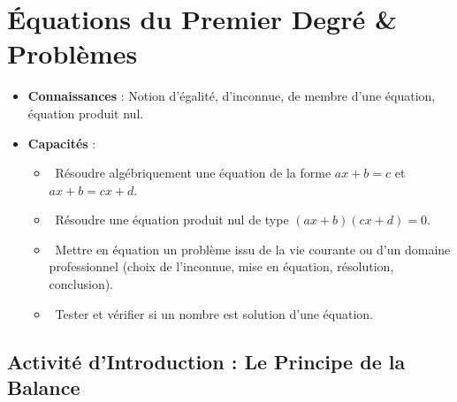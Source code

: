 \chapter{Équations du Premier Degré \& Problèmes}
\label{chap:equations}

\begin{cadreretenu}
\begin{itemize}
    \item \textbf{Connaissances} : Notion d'égalité, d'inconnue, de membre d'une équation, équation produit nul.
    \item \textbf{Capacités} :
    \begin{itemize}
        \item \capRealiser\ Résoudre algébriquement une équation de la forme $ax + b = c$ et $ax + b = cx + d$.
        \item \capRealiser\ Résoudre une équation produit nul de type $(ax + b)(cx + d) = 0$.
        \item \capAnalyser\ Mettre en équation un problème issu de la vie courante ou d'un domaine professionnel (choix de l'inconnue, mise en équation, résolution, conclusion).
        \item \capValider\ Tester et vérifier si un nombre est solution d'une équation.
    \end{itemize}
\end{itemize}
\end{cadreretenu}

\vspace{0.3cm}

\section{Activité d'Introduction : Le Principe de la Balance}

